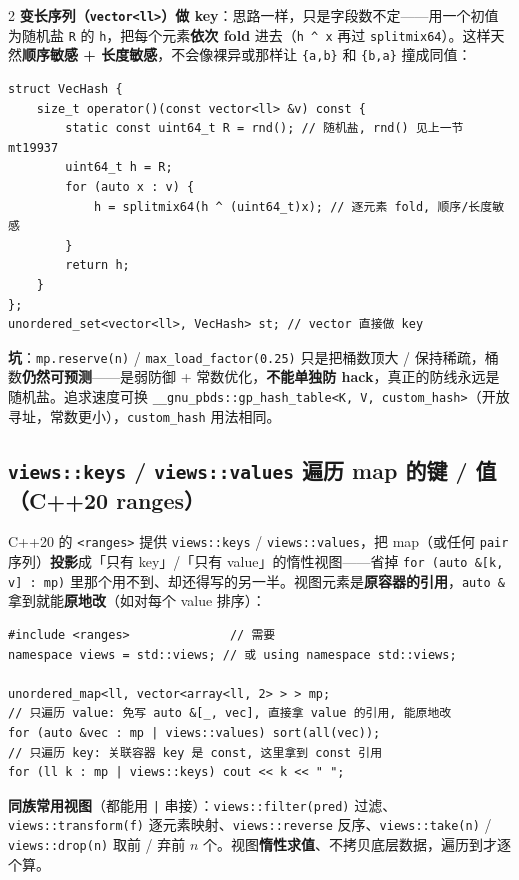 \begin{multicols*}{2}
		\textbf{变长序列（\texttt{vector<ll>}）做 key}：思路一样，只是字段数不定——用一个初值为随机盐 \texttt{R} 的 \texttt{h}，把每个元素\textbf{依次 fold} 进去（\texttt{h \^{} x} 再过 \texttt{splitmix64}）。这样天然\textbf{顺序敏感 + 长度敏感}，不会像裸异或那样让 \texttt{\{a,b\}} 和 \texttt{\{b,a\}} 撞成同值：

		\begin{verbatim}
struct VecHash {
	size_t operator()(const vector<ll> &v) const {
		static const uint64_t R = rnd(); // 随机盐, rnd() 见上一节 mt19937
		uint64_t h = R;
		for (auto x : v) {
			h = splitmix64(h ^ (uint64_t)x); // 逐元素 fold, 顺序/长度敏感
		}
		return h;
	}
};
unordered_set<vector<ll>, VecHash> st; // vector 直接做 key
		\end{verbatim}

		\textbf{坑}：\texttt{mp.reserve(n)} / \texttt{max\_load\_factor(0.25)} 只是把桶数顶大 / 保持稀疏，桶数\textbf{仍然可预测}——是弱防御 + 常数优化，\textbf{不能单独防 hack}，真正的防线永远是随机盐。追求速度可换 \texttt{\_\_gnu\_pbds::gp\_hash\_table<K, V, custom\_hash>}（开放寻址，常数更小），\texttt{custom\_hash} 用法相同。

		\subsection{\texttt{views::keys} / \texttt{views::values} 遍历 map 的键 / 值（C++20 ranges）}

		C++20 的 \texttt{<ranges>} 提供 \texttt{views::keys} / \texttt{views::values}，把 map（或任何 \texttt{pair} 序列）\textbf{投影}成「只有 key」/「只有 value」的惰性视图——省掉 \texttt{for (auto \&[k, v] : mp)} 里那个用不到、却还得写的另一半。视图元素是\textbf{原容器的引用}，\texttt{auto \&} 拿到就能\textbf{原地改}（如对每个 value 排序）：

		\begin{verbatim}
#include <ranges>              // 需要
namespace views = std::views; // 或 using namespace std::views;

unordered_map<ll, vector<array<ll, 2> > > mp;
// 只遍历 value: 免写 auto &[_, vec], 直接拿 value 的引用, 能原地改
for (auto &vec : mp | views::values) sort(all(vec));
// 只遍历 key: 关联容器 key 是 const, 这里拿到 const 引用
for (ll k : mp | views::keys) cout << k << " ";
		\end{verbatim}

		\textbf{同族常用视图}（都能用 \texttt{|} 串接）：\texttt{views::filter(pred)} 过滤、\texttt{views::transform(f)} 逐元素映射、\texttt{views::reverse} 反序、\texttt{views::take(n)} / \texttt{views::drop(n)} 取前 / 弃前 \(n\) 个。视图\textbf{惰性求值}、不拷贝底层数据，遍历到才逐个算。


\end{multicols*}
